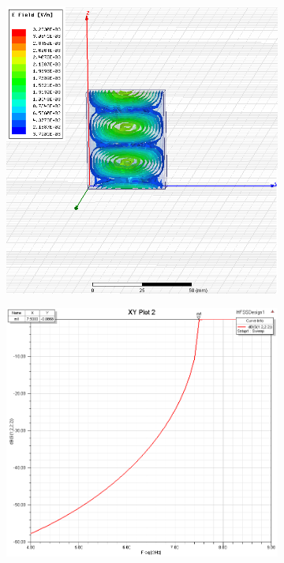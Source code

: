 \documentclass[12pt,a4paper]{article}
\begin{document}
\begin{figure}
\begin{subfigure}[b]{0.49\textwidth}
    \label{fig:1_7ghz}
  \end{subfigure}\\
  \begin{subfigure}[b]{0.49\textwidth}
    \includegraphics[width=\textwidth]{./HFSSDesign1/9ghz.png}
    \label{fig:1_9ghz}
  \end{subfigure}
  \begin{subfigure}[b]{0.49\textwidth}
    \includegraphics[width=\textwidth]{./HFSSDesign1/s1222.png}

\end{subfigure}
\end{figure}
\end{document}
